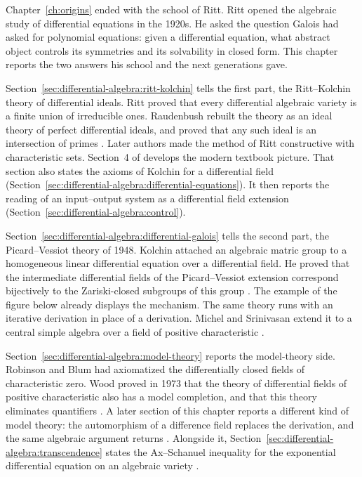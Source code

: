 
Chapter~\ref{ch:origins} ended with the school of Ritt. Ritt opened the
algebraic study of differential equations in the 1920s. He asked the
question Galois had asked for polynomial equations: given a differential
equation, what abstract object controls its symmetries and its solvability
in closed form. This chapter reports the two answers his school and the
next generations gave.

Section~\ref{sec:differential-algebra:ritt-kolchin} tells the first part,
the Ritt--Kolchin theory of differential ideals. Ritt proved that every
differential algebraic variety is a finite union of irreducible ones.
Raudenbush rebuilt the theory as an ideal theory of perfect differential
ideals, and proved that any such ideal is an intersection of primes
\cite[p.~365]{Raudenbush1934}. Later authors made the method of Ritt
constructive with characteristic sets. Section~4 of
\cite{HubbardLundell2011} develops the modern textbook picture.
That section also states the axioms of Kolchin for a differential field
(Section~\ref{sec:differential-algebra:differential-equations}). It then
reports the reading of an input--output system as a differential field
extension (Section~\ref{sec:differential-algebra:control}).

Section~\ref{sec:differential-algebra:differential-galois} tells the second
part, the Picard--Vessiot theory of 1948. Kolchin attached an algebraic
matric group to a homogeneous linear differential equation over a
differential field. He proved that the intermediate differential fields of
the Picard--Vessiot extension correspond bijectively to the Zariski-closed
subgroups of this group \cite[p.~32]{Kolchin1948PicardVessiot}. The
example of the figure below already displays the mechanism. The same theory
runs with an iterative derivation in place of a derivation. Michel and
Srinivasan extend it to a central simple algebra over a field of positive
characteristic \cite[Theorem~2.2, p.~3]{MichelSrinivasan2026}.

Section~\ref{sec:differential-algebra:model-theory} reports the
model-theory side. Robinson and Blum had axiomatized the differentially
closed fields of characteristic zero. Wood proved in 1973 that the theory
of differential fields of positive characteristic also has a model
completion, and that this theory eliminates quantifiers
\cite[p.~582]{Wood1973ModelTheory}. A later section of this chapter reports a
different kind of model theory: the automorphism of a difference field
replaces the derivation, and the same algebraic argument returns
\cite[p.~579]{PillayZiegler2003}. Alongside it, Section~\ref{sec:differential-algebra:transcendence}
states the Ax--Schanuel inequality for the exponential differential equation
on an algebraic variety \cite[Theorem~2.2, p.~6]{Aslanyan2018}.

